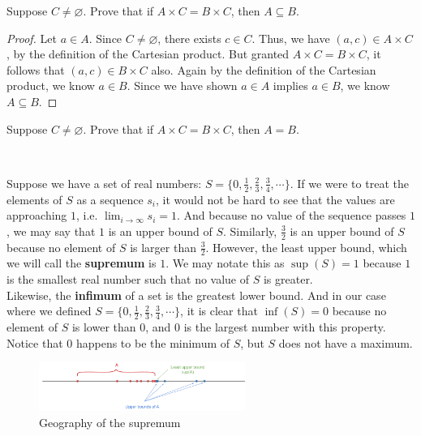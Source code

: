\begin{example}
    Suppose $C\neq\varnothing$. Prove that if $A\times C = B\times C$, then $A\subseteq B$. \\
    \begin{proof}
        Let $a\in A$. Since $C\neq\varnothing$, there exists $c\in C$. Thus, we have $(a,c)\in A\times C$, by the definition of the Cartesian product. But granted $A\times C=B\times C$, it follows that $(a,c)\in B\times C$ also. Again by the definition of the Cartesian product, we know $a\in B$. Since we have shown $a\in A$ implies $a\in B$, we know $A\subseteq B$. 
    \end{proof}
\end{example}

\begin{exercise}
    Suppose $C\neq\varnothing$. Prove that if $A\times C = B\times C$, then $A=B$. 
\end{exercise}
\

Suppose we have a set of real numbers: $S=\{0,\frac{1}{2},\frac{2}{3},\frac{3}{4},\cdots\}$. If we were to treat the elements of $S$ as a sequence $s_i$, it would not be hard to see that the values are approaching $1$, i.e. $\lim_{i\to\infty}s_i=1$. And because no value of the sequence passes $1$, we may say that $1$ is an upper bound of $S$. Similarly, $\frac{3}{2}$ is an upper bound of $S$ because no element of $S$ is larger than $\frac{3}{2}$. However, the least upper bound, which we will call the \textbf{supremum} is $1$. We may notate this as $\sup(S)=1$ because $1$ is the smallest real number such that no value of $S$ is greater. \\

Likewise, the \textbf{infimum} of a set is the greatest lower bound. And in our case where we defined $S=\{0,\frac{1}{2},\frac{2}{3},\frac{3}{4},\cdots\}$, it is clear that $\inf(S)=0$ because no element of $S$ is lower than $0$, and $0$ is the largest number with this property. Notice that $0$ happens to be the minimum of $S$, but $S$ does not have a maximum. \clearpage

\begin{figure}
  \begin{center}
    \includegraphics[width=0.6\textwidth]{Images/0sup.png}
  \end{center}
  \caption{Geography of the supremum}
\end{figure}


